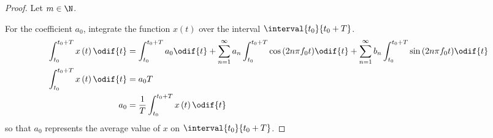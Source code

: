 \documentclass{article}
\begin{document}
\begin{proof}
    Let \(m \in \N\).

    For the coefficient \(a_0\), integrate the function \(x\left( t \right)\) over the interval \(\interval{t_0}{t_0 + T}\).
    \begin{align*}
        \int_{t_0}^{t_0 + T} x\left( t \right) \odif{t} & = \int_{t_0}^{t_0 + T} a_0 \odif{t} + \sum_{n = 1}^\infty a_n \int_{t_0}^{t_0 + T} \cos{\left( 2 n \pi f_0 t \right)} \odif{t} + \sum_{n = 1}^\infty b_n \int_{t_0}^{t_0 + T} \sin{\left( 2 n \pi f_0 t \right)} \odif{t} \\
        \int_{t_0}^{t_0 + T} x\left( t \right) \odif{t} & = a_0 T                                                                                                                                                                                                                   \\
        a_0                                             & = \frac{1}{T} \int_{t_0}^{t_0 + T} x\left( t \right) \odif{t}
    \end{align*}
    so that \(a_0\) represents the average value of \(x\) on \(\interval{t_0}{t_0 + T}\).


\end{proof}
\end{document}
